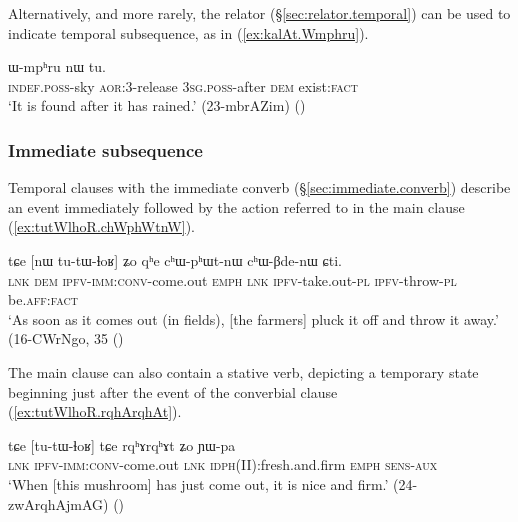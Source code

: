 Alternatively, and more rarely, the relator  (§\ref{sec:relator.temporal}) can be used to indicate temporal subsequence, as in (\ref{ex:kalAt.Wmphru}). 

 \begin{exe}
\ex \label{ex:kalAt.Wmphru}
\gll [tɯ-mɯ ka-lɤt] ɯ-mpʰru nɯ tu.    \\
 \textsc{indef}.\textsc{poss}-sky \textsc{aor}:3\flobv{}-release 3\textsc{sg}.\textsc{poss}-after \textsc{dem} exist:\textsc{fact} \\
\glt  `It is found after it has rained.' (23-mbrAZim)
()
\end{exe}

  
 \subsubsection{Immediate subsequence} \label{sec:immediate.subsequence}
Temporal clauses with the immediate converb (§\ref{sec:immediate.converb}) describe an event immediately followed by the action referred to in the main clause (\ref{ex:tutWlhoR.chWphWtnW}).
 
\begin{exe}
\ex \label{ex:tutWlhoR.chWphWtnW} 
\gll   tɕe [nɯ tu-tɯ-ɬoʁ] ʑo qʰe cʰɯ-pʰɯt-nɯ cʰɯ-βde-nɯ ɕti. \\
\textsc{lnk} \textsc{dem} \textsc{ipfv}-\textsc{imm}:\textsc{conv}-come.out \textsc{emph} \textsc{lnk} \textsc{ipfv}-take.out-\textsc{pl} \textsc{ipfv}-throw-\textsc{pl} be.\textsc{aff}:\textsc{fact} \\
\glt `As soon as it comes out (in fields), [the farmers] pluck it off and throw it away.' (16-CWrNgo, 35
()
 \end{exe}  
  
The main clause can also contain a stative verb, depicting a temporary state beginning just after the event of the converbial clause (\ref{ex:tutWlhoR.rqhArqhAt}).
 
\begin{exe}
\ex \label{ex:tutWlhoR.rqhArqhAt} 
\gll tɕe [tu-tɯ-ɬoʁ] tɕe rqʰɤrqʰɤt ʑo ɲɯ-pa  \\
\textsc{lnk} \textsc{ipfv}-\textsc{imm}:\textsc{conv}-come.out \textsc{lnk} \textsc{idph}(II):fresh.and.firm \textsc{emph} \textsc{sens}-\textsc{aux} \\
\glt `When [this mushroom] has just come out, it is nice and firm.' (24-zwArqhAjmAG)
()
  \end{exe}  
  
